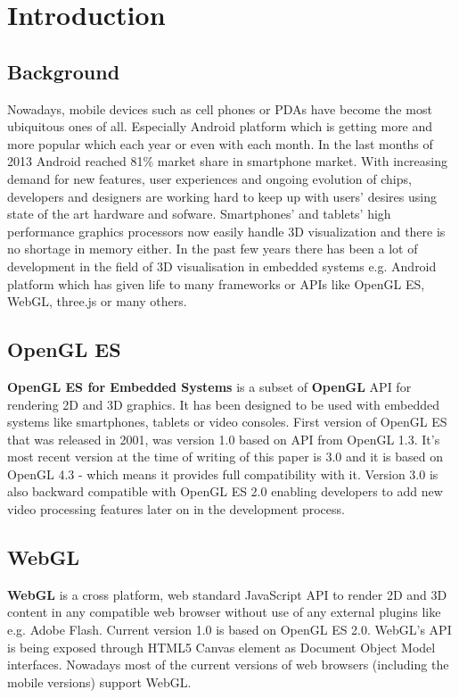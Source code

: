 \documentclass[a4paper,12pt]{article}
\begin{document}



\section{Introduction}

\subsection{Background}
Nowadays, mobile devices such as cell phones or PDAs have become the most ubiquitous ones of all.
Especially Android platform which is getting more and more popular which each year or even with each month.
In the last months of 2013 Android reached 81\% market share in smartphone market. 
With increasing demand for new features, user experiences and ongoing evolution of chips,  developers and designers are working hard to keep up with users' desires using state of the art hardware and sofware.
Smartphones’ and tablets’ high performance graphics processors now easily handle 3D visualization and there is no shortage in memory either. 
In the past few years there has been a lot of development in the field of 3D visualisation in embedded systems e.g. Android platform which has given life to many frameworks or APIs like OpenGL ES, WebGL, three.js or many others.


\subsection{OpenGL ES}
\textbf{OpenGL ES for Embedded Systems} \cite{opengles_kronos} is a subset of \textbf{OpenGL} \cite{opengl_kronos} API for rendering 2D and 3D graphics.
It has been designed to be used with embedded systems like smartphones, tablets or video consoles.
First version of OpenGL ES that was released in 2001, was version 1.0 based on API from OpenGL 1.3.
It's most recent version at the time of writing of this paper is 3.0 and it is based on OpenGL 4.3 - which means it provides full compatibility with it. 
Version 3.0 is also backward compatible with OpenGL ES 2.0 enabling developers to add new video processing features later on in the development process.


\subsection{WebGL}
\textbf{WebGL} \cite{webgl_kronos} is a cross platform, web standard JavaScript API to render 2D and 3D content in any compatible web browser without use of any external plugins like e.g. Adobe Flash.
Current version 1.0 is based on OpenGL ES 2.0. WebGL's API is being exposed through HTML5 Canvas element as Document Object Model interfaces.
Nowadays most of the current versions of web browsers (including the mobile versions) support WebGL.
\end{document}
